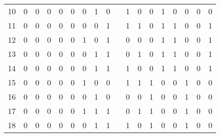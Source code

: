 \begin{table}[htbp]
\begin{tabular}{|c|c|c|c|c|c|c|c|c|c|c|c|c|c|c|c|c|c|}
		\cline{1-9}\cline{11-18}    10    & 0     & 0     & 0     & 0     & 0     & 0     & 1     & 0     &       & 1     & 0     & 0     & 1     & 0     & 0     & 0     & 0 \bigstrut\\
		\cline{1-9}\cline{11-18}    11    & 0     & 0     & 0     & 0     & 0     & 0     & 0     & 1     &       & 1     & 1     & 0     & 1     & 1     & 0     & 0     & 1 \bigstrut\\
		\cline{1-9}\cline{11-18}    12    & 0     & 0     & 0     & 0     & 0     & 1     & 0     & 1     &       & 0     & 0     & 0     & 1     & 1     & 0     & 0     & 1 \bigstrut\\
		\cline{1-9}\cline{11-18}    13    & 0     & 0     & 0     & 0     & 0     & 0     & 1     & 1     &       & 0     & 1     & 0     & 1     & 1     & 0     & 0     & 1 \bigstrut\\
		\cline{1-9}\cline{11-18}    14    & 0     & 0     & 0     & 0     & 0     & 0     & 1     & 1     &       & 1     & 0     & 0     & 1     & 1     & 0     & 0     & 1 \bigstrut\\
		\cline{1-9}\cline{11-18}    15    & 0     & 0     & 0     & 0     & 0     & 1     & 0     & 0     &       & 1     & 1     & 1     & 0     & 0     & 1     & 0     & 0 \bigstrut\\
		\cline{1-9}\cline{11-18}    16    & 0     & 0     & 0     & 0     & 0     & 0     & 1     & 0     &       & 0     & 0     & 1     & 0     & 0     & 1     & 0     & 0 \bigstrut\\
		\cline{1-9}\cline{11-18}    17    & 0     & 0     & 0     & 0     & 0     & 1     & 1     & 1     &       & 0     & 1     & 1     & 0     & 0     & 1     & 0     & 0 \bigstrut\\
		\cline{1-9}\cline{11-18}    18    & 0     & 0     & 0     & 0     & 0     & 0     & 1     & 1     &       & 1     & 0     & 1     & 0     & 0     & 1     & 0     & 0 \bigstrut\\
		\hline
	\end{tabular}%
	\label{tab:addlabel}%
\end{table}%

